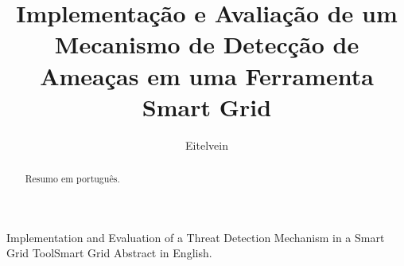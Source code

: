 \documentclass[cic,tc]{iiufrgs}
\title{Implementação e Avaliação de um Mecanismo de Detecção de Ameaças em uma Ferramenta Smart Grid}
\author{Eitelvein}{Luiza dos Santos}
\begin{document}
\maketitle





\begin{abstract}
    Resumo em português.
\end{abstract}

\begin{englishabstract}{Implementation and Evaluation of a Threat Detection Mechanism in a Smart Grid Tool}{Smart Grid}
    Abstract in English.
\end{englishabstract}


\end{document}
